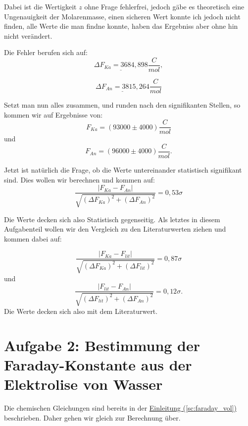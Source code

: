 Dabei ist die Wertigkeit $z$ ohne Frage fehlerfrei, jedoch gäbe es theoretisch eine Ungenauigkeit der Molarenmasse, einen sicheren Wert konnte ich jedoch nicht finden,
alle Werte die man findne konnte, haben das Ergebniss aber ohne hin nicht verändert.

Die Fehler berufen sich auf:
\begin{equation}
    \underline{\Delta F_{Ka} = 3684,898} \frac{C}{mol},
\end{equation}

\begin{equation}
    \underline{\Delta F_{An} = 3815,264} \frac{C}{mol}
\end{equation}


Setzt man nun alles zusammen, und runden nach den signifikanten Stellen, so kommen wir auf Ergebnisse von:
\begin{equation}
    \boxed{
        F_{Ka} = (93000 \pm 4000) \frac{C}{mol}
    }
\end{equation}
und
\begin{equation}
    \boxed{
        F_{An} = (96000 \pm 4000) \frac{C}{mol}.
    }
\end{equation}

Jetzt ist natürlich die Frage, ob die Werte untereinander statistisch signifikant sind. Dies wollen wir berechnen und kommen auf:
\begin{equation}
    \frac{\left| F_{Ka} - F_{An} \right|}{\sqrt{(\Delta F_{Ka})^2 + (\Delta F_{An})^2} } = 0,53\sigma
\end{equation}

Die Werte decken sich also Statistisch gegenseitig. 
Als letztes in diesem Aufgabenteil wollen wir den Vergleich zu den Literaturwerten ziehen und kommen dabei auf:

\begin{equation}
    \frac{\left| F_{Ka} - F_{lit} \right|}{\sqrt{(\Delta F_{Ka})^2 + (\Delta F_{lit})^2} } = 0,87\sigma
\end{equation}
und
\begin{equation}
    \frac{\left| F_{lit} - F_{An} \right|}{\sqrt{(\Delta F_{lit})^2 + (\Delta F_{An})^2} } = 0,12\sigma.
\end{equation}
Die Werte decken sich also mit dem Literaturwert.



\section{Aufgabe 2: Bestimmung der Faraday-Konstante aus der Elektrolise von Wasser}
Die chemischen Gleichungen sind bereits in der \hyperref[sc:faraday_vol]{Einleitung (\ref*{sc:faraday_vol})} beschrieben. Daher gehen wir gleich zur Berechnung über.


